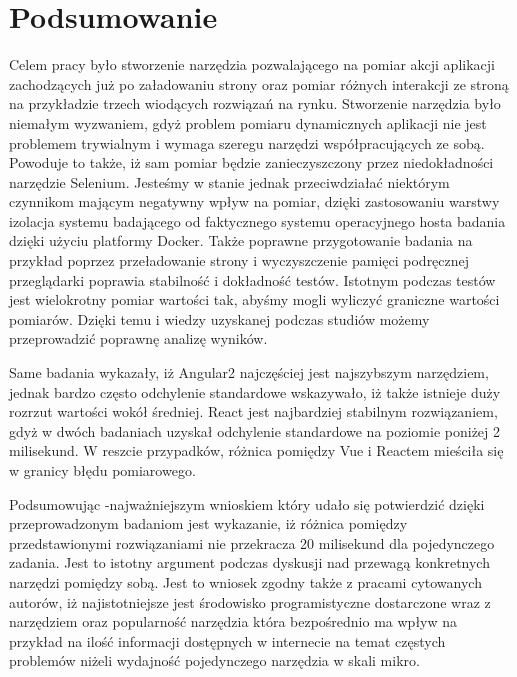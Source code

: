 \chapter{Podsumowanie}

Celem pracy było stworzenie narzędzia pozwalającego na pomiar akcji aplikacji zachodzących już po załadowaniu strony oraz pomiar różnych interakcji ze stroną na przykładzie trzech wiodących rozwiązań na rynku.
Stworzenie narzędzia było niemałym wyzwaniem, gdyż problem pomiaru dynamicznych aplikacji nie jest problemem trywialnym i wymaga szeregu narzędzi współpracujących ze sobą.
Powoduje to także, iż sam pomiar będzie zanieczyszczony przez niedokładności narzędzie Selenium.
Jesteśmy w stanie jednak przeciwdziałać niektórym czynnikom mającym negatywny wpływ na pomiar, dzięki zastosowaniu warstwy izolacja systemu badającego od faktycznego systemu operacyjnego hosta badania dzięki użyciu platformy Docker.
Także poprawne przygotowanie badania na przykład poprzez przeładowanie strony i wyczyszczenie pamięci podręcznej przeglądarki poprawia stabilność i dokładność testów.
Istotnym podczas testów jest wielokrotny pomiar wartości tak, abyśmy mogli wyliczyć graniczne wartości pomiarów. Dzięki temu i wiedzy uzyskanej podczas studiów możemy przeprowadzić poprawnę analizę wyników.

Same badania wykazały, iż Angular2 najczęściej jest najszybszym narzędziem, jednak bardzo często odchylenie standardowe wskazywało, iż także istnieje duży rozrzut wartości wokół średniej.
React jest najbardziej stabilnym rozwiązaniem, gdyż w dwóch badaniach uzyskał odchylenie standardowe na poziomie poniżej 2 milisekund. W reszcie przypadków, różnica pomiędzy Vue i Reactem mieściła się w granicy błędu pomiarowego.

Podsumowując -najważniejszym wnioskiem który udało się potwierdzić dzięki przeprowadzonym badaniom jest wykazanie, iż różnica pomiędzy przedstawionymi rozwiązaniami nie przekracza 20 milisekund dla pojedynczego zadania.
Jest to istotny argument podczas dyskusji nad przewagą konkretnych narzędzi pomiędzy sobą.
Jest to wniosek zgodny także z pracami cytowanych autorów, iż najistotniejsze jest środowisko programistyczne dostarczone wraz z narzędziem oraz popularność narzędzia która bezpośrednio ma wpływ na przykład
na ilość informacji dostępnych w internecie na temat częstych problemów niżeli wydajność pojedynczego narzędzia w skali mikro.


\let\cleardoublepage\clearpage